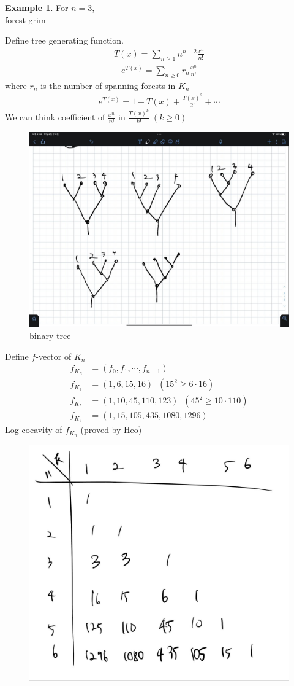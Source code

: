 \documentclass{article}
\theoremstyle{definition}
\newtheorem{ex}{Example}[]
\begin{document}
\begin{ex}
    For $n=3$, \\ 
    forest grim
\end{ex}
Define tree generating function. 
\begin{align*}
    T(x) = \sum_{n \ge 1} n^{n-2} \frac{x^n}{n!} 
\end{align*}
\begin{align*}
    e^{T(x)} = \sum_{n\ge 0} r_n \frac{x^n}{n!} 
\end{align*}
where $r_n$ is the number of spanning forests in $K_n$
\begin{align*}
    e^{T(x)} = 1 + T(x) + \frac{T(x)^2}{2!} + \cdots
\end{align*}
We can think coefficient of $\frac{x^n}{n!}$ in $\frac{T(x)^k}{k!} \; (k\ge 0)$ \\ 
\begin{figure}[!h]
    \centerline{\includegraphics[width=0.5\columnwidth]{tree.jpg}}
    \caption{binary tree}
    \label{tree} 
\end{figure}
Define $f$-vector of $K_n$ 
\begin{align*}
    f_{K_n} &= (f_0, f_1, \cdots , f_{n-1}) \\ 
    f_{K_4} &= (1, 6, 15, 16) \;\; (15^2 \ge 6 \cdot 16)\\ 
    f_{K_5} &= (1, 10, 45, 110, 123)  \;\; (45^2 \ge 10 \cdot 110)\\ 
    f_{K_6} &= (1, 15, 105, 435, 1080, 1296)
\end{align*}
Log-cocavity of $f_{K_n}$ (proved by Heo) \\ 
\begin{figure}[!h]
    \centerline{\includegraphics[width=0.5\columnwidth]{n_k_pyo.jpg}}
    \caption{}
    \label{n_k_pyo} 
\end{figure}
\end{document}
